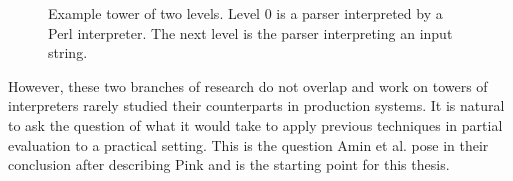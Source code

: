 \documentclass[a4paper,12pt,twoside,openright]{report}
\theoremstyle{definition}
\begin{document}
\begin{figure}[htp!]
    \centering
    \caption{Example tower of two levels. Level 0 is a parser interpreted by a Perl interpreter. The next level is the parser interpreting an input string.}
    \label{fig:tombstone_tower_parser}
\end{figure}

However, these two branches of research do not overlap and work on towers of interpreters rarely studied their counterparts in production systems. It is natural to ask the question of what it would take to apply previous techniques in partial evaluation to a practical setting. This is the question Amin et al. pose in their conclusion after describing Pink \cite{amin2017collapsing} and is the starting point for this thesis.
\end{document}
